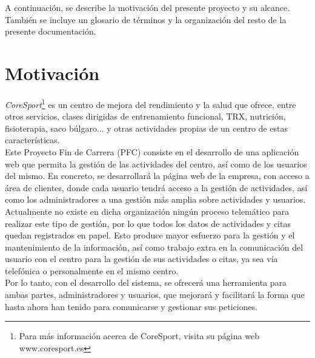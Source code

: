 


A continuación, se describe la motivación del presente proyecto y su alcance. También se incluye un glosario de términos y la organización del resto de la presente documentación.

\section{Motivación}\label{sec:introduccion}

\textsl{CoreSport}\footnote{Para más información acerca de CoreSport, visita su página web www.coresport.es} es un centro de mejora del rendimiento y la salud que ofrece, entre otros servicios, clases dirigidas de entrenamiento funcional, TRX, nutrición, fisioterapia, saco búlgaro... y otras actividades propias de un centro de estas características.
\\
Este Proyecto Fin de Carrera (PFC) consiste en el desarrollo de una aplicación web que permita la gestión de las actividades del centro, así como de los usuarios del mismo. En concreto, se desarrollará la página web de la empresa, con acceso a área de clientes, donde cada usuario tendrá acceso a la gestión de actividades, así como los administradores a una gestión más amplia sobre actividades y usuarios. 
\\

Actualmente no existe en dicha organización ningún proceso telemático para realizar este tipo de gestión, por lo que todos los datos de actividades y citas quedan registrados en papel. Esto produce mayor esfuerzo para la gestión y el mantenimiento de la información, así como trabajo extra en la comunicación del usuario con el centro para la gestión de sus actividades o citas, ya sea vía telefónica o personalmente en el mismo centro.
\\

Por lo tanto, con el desarrollo del sistema, se ofrecerá una herramienta para ambas partes, administradores y usuarios, que mejorará y facilitará la forma que hasta ahora han tenido para comunicarse y gestionar sus peticiones.


